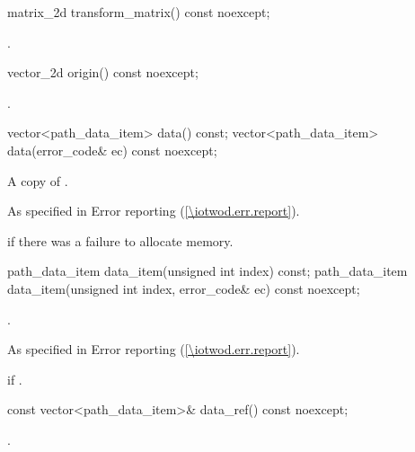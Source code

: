 \begin{itemdecl}
    matrix_2d transform_matrix() const noexcept;
\end{itemdecl}
\begin{itemdescr}
	\pnum
	\returns
	.
\end{itemdescr}

\begin{itemdecl}
    vector_2d origin() const noexcept;
\end{itemdecl}
\begin{itemdescr}
	\pnum
	\returns
	.
\end{itemdescr}

\begin{itemdecl}
    vector<path_data_item> data() const;
    vector<path_data_item> data(error_code& ec) const noexcept;
\end{itemdecl}
\begin{itemdescr}
	\pnum
	\returns
	A copy of .

	\pnum
	\throws
	As specified in Error reporting (\ref{\iotwod.err.report}).

	\pnum
	\errors
	 if there was a failure to allocate memory.
\end{itemdescr}

\begin{itemdecl}
    path_data_item data_item(unsigned int index) const;
    path_data_item data_item(unsigned int index, error_code& ec) const noexcept;
\end{itemdecl}
\begin{itemdescr}
	\pnum
	\returns
	.
	
	\pnum
	\throws
	As specified in Error reporting (\ref{\iotwod.err.report}).

	\pnum
	\errors
	 if .
\end{itemdescr}

\begin{itemdecl}
    const vector<path_data_item>& data_ref() const noexcept;
\end{itemdecl}
\begin{itemdescr}
	\pnum
	\returns
	.
\end{itemdescr}
